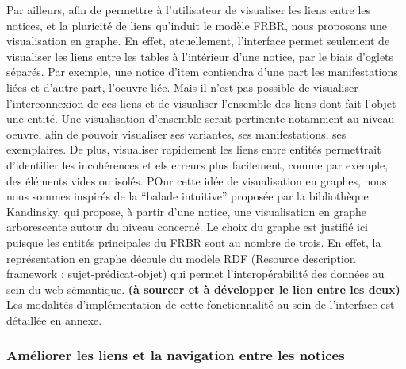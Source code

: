 Par ailleurs, afin de permettre à l'utilisateur de visualiser les liens entre les notices, et la pluricité de liens qu'induit le modèle FRBR, nous proposons une visualisation en graphe. En effet, atcuellement, l'interface permet seulement de visualiser les liens entre les tables à l'intérieur d'une notice, par le biais d'oglets séparés. Par exemple, une notice d'item contiendra d'une part les manifestations liées et d'autre part, l'oeuvre liée.  Mais il n'est pas possible de visualiser l'interconnexion de ces liens et de visualiser l'ensemble des liens dont fait l'objet une entité. Une visualisation d'ensemble serait pertinente notamment au niveau oeuvre, afin de pouvoir visualiser ses variantes, ses manifestations, ses exemplaires. De plus, visualiser rapidement les liens entre entités permettrait d’identifier les incohérences et els erreurs plus facilement, comme par exemple, des éléments vides ou isolés. POur cette idée de visualisation en graphes, nous nous sommes inspirés de la “balade intuitive” proposée par la bibliothèque Kandinsky, qui propose, à partir d'une notice, une visualisation en graphe arborescente autour du niveau concerné. Le choix du graphe est justifié ici puisque les entités principales du FRBR sont au nombre de trois. En effet, la représentation en graphe découle du modèle RDF (Resource description framework : sujet-prédicat-objet) qui permet l’interopérabilité des données au sein du web sémantique. \textbf{(à sourcer et à développer le lien entre les deux)}
Les modalités d'implémentation de cette fonctionnalité au sein de l'interface est détaillée en annexe. 

\subsubsection{Améliorer les liens et la navigation entre les notices}

